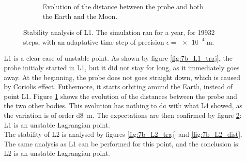 \documentclass[a4paper,12pt,twoside]{article}
\begin{document}
\begin{figure}[h]
\begin{subfigure}[t]{0.4\textwidth}
    \caption{Evolution of the distance between the probe and both the Earth and the Moon.}
    \label{fig:7b_L1_dist}
  \end{subfigure}
  \caption{Stability analysis of L1. The simulation ran for a year, for \num{19932} steps, with an adaptative time step of precision $\epsilon = \SI{e-4}{\m}$.}
  \label{fig:7b_L1}
\end{figure}

L1 is a clear case of unstable point.
As shown by figure \ref{fig:7b_L1_traj}, the probe initialy started in L1, but it did not stay for long, as it immediately goes away.
At the beginning, the probe does not goes straight down, which is caused by Coriolis effect.
Futhermore, it starts orbiting around the Earth, instead of point L1.
Figure \ref{fig:7b_L1_dist} shows the evolution of the distances between the probe and the two other bodies.
This evolution has nothing to do with what L4 showed, as the variation is of order \SI{d8}{\m}.
The expectations are then confirmed by figure \ref{fig:7b_L1}: L1 is an unstable Lagrangian point.\\

The stability of L2 is analysed by figures \ref{fig:7b_L2_traj} and \ref{fig:7b_L2_dist}.
The same analysis as L1 can be performed for this point, and the conclusion is: L2 is an unstable Lagrangian point.\\
\end{document}
